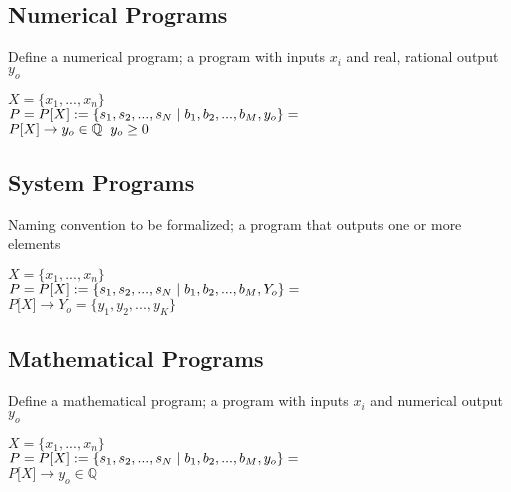 \documentclass[11pt]{article}
\begin{document}
\subsection{Numerical Programs}
Define a numerical program; a program with inputs $x_i$ and real, rational output $y_o$
\begin{center}
$
X = \{x_1,...,x_n\}
$
\\ \vspace{2mm}
$P = P\lbrack X \rbrack := \{ s_1,s_2,...,s_{N}\hspace{1mm}|\hspace{1mm} b_1, b_2,...,b_M,y_o\}=$
\\ \vspace{2mm}
$
P\lbrack X \rbrack \rightarrow y_o \in \mathbb{Q} \hspace{2mm} y_o \geq 0
$
\end{center}





\subsection{System Programs}
Naming convention to be formalized; a program that outputs one or more elements
\begin{center}
$
X = \{x_1,...,x_n\}
$
\\ \vspace{2mm}
$P = P\lbrack X \rbrack := \{ s_1,s_2,...,s_{N}\hspace{1mm}|\hspace{1mm} b_1, b_2,...,b_M,Y_o\}=$
\\ \vspace{2mm}
$
P\lbrack X \rbrack \rightarrow Y_o = \{y_1,y_2,...,y_K\}
$
\end{center}





\subsection{Mathematical Programs}
Define a mathematical program; a program with inputs $x_i$ and numerical output $y_o$
\begin{center}
$
X = \{x_1,...,x_n\}
$
\\ \vspace{2mm}
$P = P\lbrack X \rbrack := \{ s_1,s_2,...,s_{N}\hspace{1mm}|\hspace{1mm} b_1, b_2,...,b_M,y_o\}=$
\\ \vspace{2mm}
$
P\lbrack X \rbrack \rightarrow y_o \in \mathbb{Q}
$
\end{center}
\end{document}
